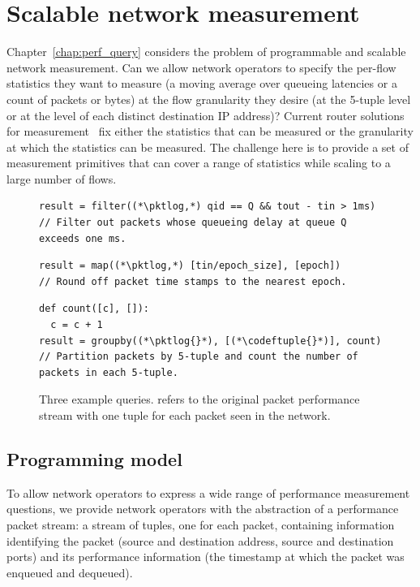 \section{Scalable network measurement}
Chapter~\ref{chap:perf_query} considers the problem of programmable and
scalable network measurement. Can we allow network operators to specify the
per-flow statistics they want to measure (\eg a moving average over queueing
latencies or a count of packets or bytes) at the flow granularity they desire
(\eg at the 5-tuple level or at the level of each distinct destination IP
address)? Current router solutions for measurement~\cite{netflow,
tetration-telemetry} fix either the statistics that can be measured or the
granularity at which the statistics can be measured. The challenge here is to
provide a set of measurement primitives that can cover a range of statistics
while scaling to a large number of flows.

\begin{figure}
\begin{minipage}[!h]{\textwidth}
\centering
\begin{lstlisting}
result = filter((*\pktlog,*) qid == Q && tout - tin > 1ms)
// Filter out packets whose queueing delay at queue Q exceeds one ms.
\end{lstlisting}
\end{minipage}

\begin{minipage}[!h]{\textwidth}
\centering
\begin{lstlisting}
result = map((*\pktlog,*) [tin/epoch_size], [epoch])
// Round off packet time stamps to the nearest epoch.
\end{lstlisting}
\end{minipage}

\begin{minipage}[!h]{\textwidth}
\begin{lstlisting}
def count([c], []):
  c = c + 1
result = groupby((*\pktlog{}*), [(*\codeftuple{}*)], count)
// Partition packets by 5-tuple and count the number of packets in each 5-tuple.
\end{lstlisting}
\end{minipage}
\caption{Three example \TheSystem queries. {\ct \pktlog{}} refers to the
original packet performance stream with one tuple for each packet seen in the
network.}
\label{fig:example_queries}
\end{figure}

\subsection{Programming model} To allow network operators to express a wide
range of performance measurement questions, we provide network operators with
the abstraction of a performance packet stream: a stream of tuples, one for
each packet, containing information identifying the packet (source and
destination address, source and destination ports) and its performance
information (the timestamp at which the packet was enqueued and dequeued).

